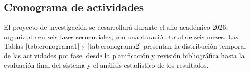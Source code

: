 
\subsection{Cronograma de actividades}

El proyecto de investigación se desarrollará durante el año académico
2026, organizado en seis fases secuenciales, con una duración total de
seis meses. Las Tablas \ref{tab:cronograma1} y \ref{tab:cronograma2}
presentan la distribución temporal de las actividades por fase, desde
la planificación y revisión bibliográfica hasta la evaluación final del
sistema y el análisis estadístico de los resultados.


